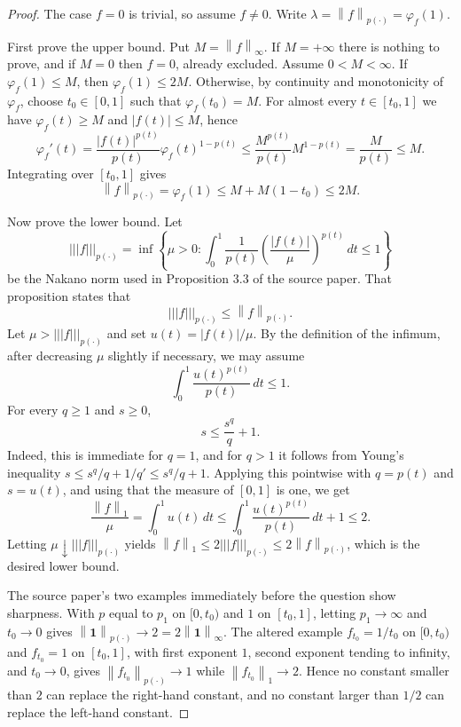\documentclass[11pt]{article}
\newcommand{\norm}[1]{\left\lVert #1 \right\rVert}
\newcommand{\abs}[1]{\left\lvert #1 \right\rvert}
\begin{document}
\begin{proof}
The case \(f=0\) is trivial, so assume \(f\neq0\).  Write
\(\lambda=\norm{f}_{p(\cdot)}=\varphi_f(1)\).

First prove the upper bound.  Put \(M=\norm{f}_\infty\).  If \(M=+\infty\)
there is nothing to prove, and if \(M=0\) then \(f=0\), already excluded.
Assume \(0<M<\infty\).  If \(\varphi_f(1)\leq M\), then
\(\varphi_f(1)\leq 2M\).  Otherwise, by continuity and monotonicity of
\(\varphi_f\), choose \(t_0\in[0,1]\) such that \(\varphi_f(t_0)=M\).  For
almost every \(t\in[t_0,1]\) we have \(\varphi_f(t)\geq M\) and
\(\abs{f(t)}\leq M\), hence
\[
  \varphi_f'(t)
  =
  \frac{\abs{f(t)}^{p(t)}}{p(t)}\varphi_f(t)^{1-p(t)}
  \leq
  \frac{M^{p(t)}}{p(t)}M^{1-p(t)}
  =
  \frac{M}{p(t)}
  \leq M.
\]
Integrating over \([t_0,1]\) gives
\[
  \norm{f}_{p(\cdot)}=\varphi_f(1)
  \leq M+M(1-t_0)\leq 2M.
\]

Now prove the lower bound.  Let
\[
  |||f|||_{p(\cdot)}
  =
  \inf\left\{\mu>0:
    \int_0^1 \frac1{p(t)}
      \left(\frac{\abs{f(t)}}{\mu}\right)^{p(t)}\,dt
    \leq 1
  \right\}
\]
be the Nakano norm used in Proposition 3.3 of the source paper.  That
proposition states that
\[
  |||f|||_{p(\cdot)}\leq \norm{f}_{p(\cdot)}.
\]
Let \(\mu>|||f|||_{p(\cdot)}\) and set \(u(t)=\abs{f(t)}/\mu\).  By the
definition of the infimum, after decreasing \(\mu\) slightly if necessary, we
may assume
\[
  \int_0^1 \frac{u(t)^{p(t)}}{p(t)}\,dt\leq 1.
\]
For every \(q\geq1\) and \(s\geq0\),
\[
  s\leq \frac{s^q}{q}+1.
\]
Indeed, this is immediate for \(q=1\), and for \(q>1\) it follows from
Young's inequality \(s\leq s^q/q+1/q'\leq s^q/q+1\).  Applying this pointwise
with \(q=p(t)\) and \(s=u(t)\), and using that the measure of \([0,1]\) is
one, we get
\[
  \frac{\norm{f}_1}{\mu}
  =
  \int_0^1 u(t)\,dt
  \leq
  \int_0^1 \frac{u(t)^{p(t)}}{p(t)}\,dt+1
  \leq 2.
\]
Letting \(\mu\downarrow |||f|||_{p(\cdot)}\) yields
\(\norm{f}_1\leq 2|||f|||_{p(\cdot)}\leq 2\norm{f}_{p(\cdot)}\), which is the
desired lower bound.

The source paper's two examples immediately before the question show
sharpness.  With \(p\) equal to \(p_1\) on \([0,t_0)\) and \(1\) on
\([t_0,1]\), letting \(p_1\to\infty\) and \(t_0\to0\) gives
\(\norm{\mathbf1}_{p(\cdot)}\to2=2\norm{\mathbf1}_\infty\).  The altered
example \(f_{t_0}=1/t_0\) on \([0,t_0)\) and \(f_{t_0}=1\) on \([t_0,1]\),
with first exponent \(1\), second exponent tending to infinity, and
\(t_0\to0\), gives \(\norm{f_{t_0}}_{p(\cdot)}\to1\) while
\(\norm{f_{t_0}}_1\to2\).  Hence no constant smaller than \(2\) can replace
the right-hand constant, and no constant larger than \(1/2\) can replace the
left-hand constant.
\end{proof}
\end{document}
